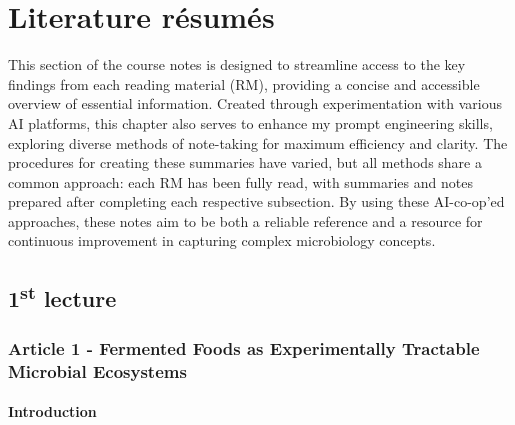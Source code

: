 \chapter{Literature résumés}
\setlength{\headheight}{12.71342pt}
\addtolength{\topmargin}{-0.71342pt}

This section of the course notes is designed to streamline access to the key findings from each reading material (RM), providing a concise and accessible overview of essential information. Created through experimentation with various AI platforms, this chapter also serves to enhance my prompt engineering skills, exploring diverse methods of note-taking for maximum efficiency and clarity. The procedures for creating these summaries have varied, but all methods share a common approach: each RM has been fully read, with summaries and notes prepared after completing each respective subsection. By using these AI-co-op'ed approaches, these notes aim to be both a reliable reference and a resource for continuous improvement in capturing complex microbiology concepts.

\section{1\texorpdfstring{\textsuperscript{st}}{st} lecture}
\subsection{Article 1 - Fermented Foods as Experimentally Tractable Microbial Ecosystems}
\subsubsection*{Introduction}
